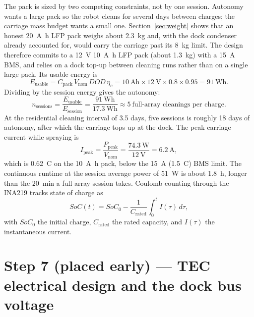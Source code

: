 \documentclass[11pt,a4paper]{article}
\begin{document}
The pack is sized by two competing constraints, not by one session. Autonomy
wants a large pack so the robot cleans for several days between charges; the
carriage mass budget wants a small one. Section~\ref{sec:weight} shows that an
honest \SI{20}{\ampere\hour} LFP pack weighs about \SI{2.3}{\kilo\gram} and, with
the dock condenser already accounted for, would carry the carriage past its
\SI{8}{\kilo\gram} limit. The design therefore commits to a \SI{12}{\volt}
\SI{10}{\ampere\hour} LFP pack (about \SI{1.3}{\kilo\gram}) with a
\SI{15}{\ampere} BMS, and relies on a dock top-up between cleaning runs rather
than on a single large pack. Its usable energy is
\begin{equation}
  E_{\text{usable}} = C_{\text{pack}}\,V_{\text{nom}}\,DOD\,\eta_{c}
  = \SI{10}{\ampere\hour}\times\SI{12}{\volt}\times\num{0.8}\times\num{0.95}
  = \SI{91}{\watt\hour}.
  \label{eq:eusable}
\end{equation}
Dividing by the session energy gives the autonomy:
\begin{equation}
  n_{\text{sessions}} = \frac{E_{\text{usable}}}{E_{\text{session}}}
  = \frac{\SI{91}{\watt\hour}}{\SI{17.3}{\watt\hour}} \approx 5
  \ \text{full-array cleanings per charge.}
  \label{eq:autonomy}
\end{equation}
At the residential cleaning interval of \num{3.5} days, five sessions is roughly
\num{18} days of autonomy, after which the carriage tops up at the dock. The peak
carriage current while spraying is
\begin{equation}
  I_{\text{peak}} = \frac{P_{\text{peak}}}{V_{\text{nom}}}
  = \frac{\SI{74.3}{\watt}}{\SI{12}{\volt}} = \SI{6.2}{\ampere},
  \label{eq:ipeak}
\end{equation}
which is \SI{0.62}{C} on the \SI{10}{\ampere\hour} pack, below the
\SI{15}{\ampere} (\SI{1.5}{C}) BMS limit. The continuous runtime at the session
average power of \SI{51}{\watt} is about \SI{1.8}{\hour}, longer than the
\SI{20}{\minute} a full-array session takes. Coulomb counting through the INA219
tracks state of charge as
\begin{equation}
  SoC(t) = SoC_0 - \frac{1}{C_{\text{rated}}}\int_0^{t} I(\tau)\,d\tau,
  \label{eq:soc}
\end{equation}
with $SoC_0$ the initial charge, $C_{\text{rated}}$ the rated capacity, and
$I(\tau)$ the instantaneous current.

\section{Step 7 (placed early) --- TEC electrical design and the dock bus voltage}
\label{sec:tec}
\end{document}
